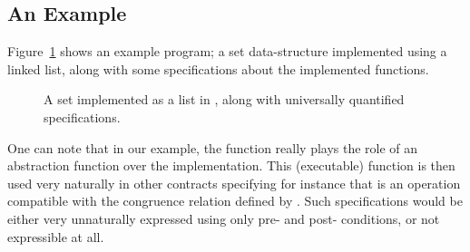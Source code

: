 \subsection{An Example}
Figure~\ref{fig:listset} shows an example program; a set data-structure
implemented using a linked list, along with some specifications about the
implemented functions.

\begin{figure}

\caption{A set implemented as a list in \purescala, along with universally quantified specifications.}
\label{fig:listset}
\end{figure}

One can note that in our example, the function  really plays
the role of an abstraction function over the implementation. This
(executable) function is then used very naturally in other contracts
specifying for instance that  is an operation compatible with
the congruence relation defined by . Such
specifications would be either very unnaturally expressed using only pre-
and post- conditions, or not expressible at all.
